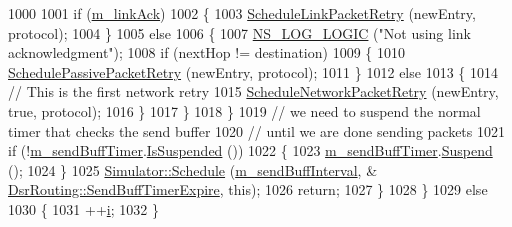 \begin{DoxyCode}
1000 
1001                   \textcolor{keywordflow}{if} (\hyperlink{classns3_1_1dsr_1_1DsrRouting_a216a52d8b579a034df948765d941d3a4}{m\_linkAck})
1002                     \{
1003                       \hyperlink{classns3_1_1dsr_1_1DsrRouting_a947d831bc0964240b1a41b3a09832eff}{ScheduleLinkPacketRetry} (newEntry, protocol);
1004                     \}
1005                   \textcolor{keywordflow}{else}
1006                     \{
1007                       \hyperlink{group__logging_ga88acd260151caf2db9c0fc84997f45ce}{NS\_LOG\_LOGIC} (\textcolor{stringliteral}{"Not using link acknowledgment"});
1008                       \textcolor{keywordflow}{if} (nextHop != destination)
1009                         \{
1010                           \hyperlink{classns3_1_1dsr_1_1DsrRouting_abfdfa37822a492971fdf24540b635039}{SchedulePassivePacketRetry} (newEntry, protocol);
1011                         \}
1012                       \textcolor{keywordflow}{else}
1013                         \{
1014                           \textcolor{comment}{// This is the first network retry}
1015                           \hyperlink{classns3_1_1dsr_1_1DsrRouting_a6a18c6baa374d5e6a68f8952d1afdb13}{ScheduleNetworkPacketRetry} (newEntry, \textcolor{keyword}{true}, protocol);
1016                         \}
1017                     \}
1018                 \}
1019               \textcolor{comment}{// we need to suspend the normal timer that checks the send buffer}
1020               \textcolor{comment}{// until we are done sending packets}
1021               \textcolor{keywordflow}{if} (!\hyperlink{classns3_1_1dsr_1_1DsrRouting_a7676aff7f691319b764fba26a726ef5d}{m\_sendBuffTimer}.\hyperlink{classns3_1_1Timer_a6eaea57766ec5e85023264fe2fb69066}{IsSuspended} ())
1022                 \{
1023                   \hyperlink{classns3_1_1dsr_1_1DsrRouting_a7676aff7f691319b764fba26a726ef5d}{m\_sendBuffTimer}.\hyperlink{classns3_1_1Timer_a168f973f4c60fbeb1580d4734f91e049}{Suspend} ();
1024                 \}
1025               \hyperlink{classns3_1_1Simulator_a671882c894a08af4a5e91181bf1eec13}{Simulator::Schedule} (\hyperlink{classns3_1_1dsr_1_1DsrRouting_a966d7c644a941e3e6365859983816e8b}{m\_sendBuffInterval}, &
      \hyperlink{classns3_1_1dsr_1_1DsrRouting_a10273aec775b5cf12eafb03ee46c4397}{DsrRouting::SendBuffTimerExpire}, \textcolor{keyword}{this});
1026               \textcolor{keywordflow}{return};
1027             \}
1028         \}
1029       \textcolor{keywordflow}{else}
1030         \{
1031           ++\hyperlink{bernuolliDistribution_8m_a6f6ccfcf58b31cb6412107d9d5281426}{i};
1032         \}

\end{DoxyCode}
